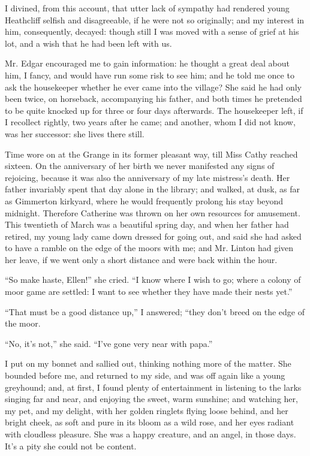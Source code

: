 \par I divined, from this account, that utter lack of sympathy had rendered young Heathcliff selfish and disagreeable, if he were not so originally; and my interest in him, consequently, decayed: though still I was moved with a sense of grief at his lot, and a wish that he had been left with us.
\par Mr. Edgar encouraged me to gain information: he thought a great deal about him, I fancy, and would have run some risk to see him; and he told me once to ask the housekeeper whether he ever came into the village? She said he had only been twice, on horseback, accompanying his father, and both times he pretended to be quite knocked up for three or four days afterwards. The housekeeper left, if I recollect rightly, two years after he came; and another, whom I did not know, was her successor: she lives there still.
\par Time wore on at the Grange in its former pleasant way, till Miss Cathy reached sixteen. On the anniversary of her birth we never manifested any signs of rejoicing, because it was also the anniversary of my late mistress's death. Her father invariably spent that day alone in the library; and walked, at dusk, as far as Gimmerton kirkyard, where he would frequently prolong his stay beyond midnight. Therefore Catherine was thrown on her own resources for amusement. This twentieth of March was a beautiful spring day, and when her father had retired, my young lady came down dressed for going out, and said she had asked to have a ramble on the edge of the moors with me; and Mr. Linton had given her leave, if we went only a short distance and were back within the hour.
\par “So make haste, Ellen!” she cried. “I know where I wish to go; where a colony of moor game are settled: I want to see whether they have made their nests yet.”
\par “That must be a good distance up,” I answered; “they don't breed on the edge of the moor.
\par “No, it's not,” she said. “I've gone very near with papa.”
\par I put on my bonnet and sallied out, thinking nothing more of the matter. She bounded before me, and returned to my side, and was off again like a young greyhound; and, at first, I found plenty of entertainment in listening to the larks singing far and near, and enjoying the sweet, warm sunshine; and watching her, my pet, and my delight, with her golden ringlets flying loose behind, and her bright cheek, as soft and pure in its bloom as a wild rose, and her eyes radiant with cloudless pleasure. She was a happy creature, and an angel, in those days. It's a pity she could not be content.
